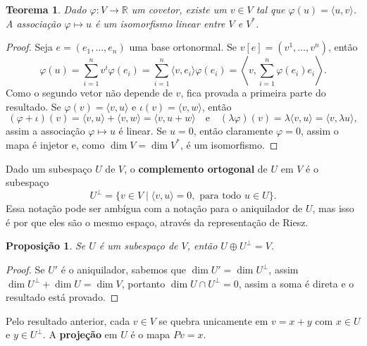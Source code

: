 \documentclass{article}
\newtheorem{proposition}[definition]{Proposição}
\newtheorem{theorem}[definition]{Teorema}
\renewcommand{\phi}{\varphi}
\begin{document}
\begin{theorem}
    Dado $\phi \colon V \to \mathbb{R}$ um covetor, existe um $v \in V$ tal que $\phi(u) = \langle u, v \rangle$. A associação $\phi \mapsto u$ é um isomorfismo linear entre $V$ e $V^*$.
\end{theorem}
\begin{proof}
    Seja $e = (e_1, \dots, e_n)$ uma base ortonormal. Se $v[e] = (v^1, \dots, v^n)$, então \begin{equation}
        \phi(u) = \sum_{i = 1}^n v^i \phi(e_i) = \sum_{i = 1}^n \langle v, e_i \rangle \phi(e_i) = \left\langle v, \sum_{i = 1}^n \phi(e_i) e_i \right\rangle.
    \end{equation} Como o segundo vetor não depende de $v$, fica provada a primeira parte do resultado. Se $\phi(v) = \langle v, u \rangle$ e $\iota(v) = \langle v, w \rangle$, então \begin{equation}
        (\phi + \iota)(v) = \langle v, u \rangle + \langle v, w \rangle = \langle v, u + w \rangle \quad \text{e} \quad (\lambda \phi)(v) = \lambda \langle v, u \rangle = \langle v, \lambda u \rangle,
    \end{equation} assim a associação $\phi \mapsto u$ é linear. Se $u = 0$, então claramente $\phi = 0$, assim o mapa é injetor e, como $\dim V = \dim V^*$, é um isomorfismo.
\end{proof}

Dado um subespaço $U$ de $V$, o \textbf{complemento ortogonal} de $U$ em $V$ é o subespaço \begin{equation}
    U^\perp = \{v \in V \mid \langle v, u \rangle = 0, \text{ para todo } u \in U\}.
\end{equation} Essa notação pode ser ambígua com a notação para o aniquilador de $U$, mas isso é por que eles são o mesmo espaço, através da representação de Riesz.

\begin{proposition}
    Se $U$ é um subespaço de $V$, então $U \oplus U^\perp = V$.
\end{proposition}
\begin{proof}
    Se $U'$ é o aniquilador, sabemos que $\dim U' = \dim U^\perp$, assim $\dim U^\perp + \dim U = \dim V$, portanto $\dim U \cap U^\perp = 0$, assim a soma é direta e o resultado está provado.
\end{proof}

Pelo resultado anterior, cada $v \in V$ se quebra unicamente em $v = x + y$ com $x \in U$ e $y \in U^\perp$. A \textbf{projeção} em $U$ é o mapa $Pv = x$.
\end{document}
